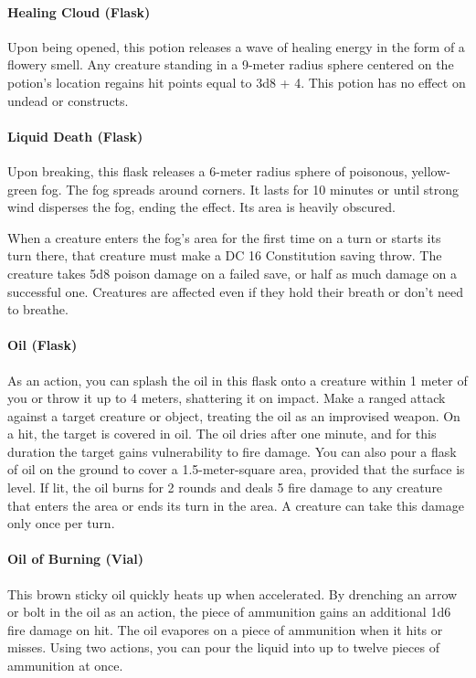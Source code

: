 \paragraph{Healing Cloud (Flask)} %
    Upon being opened, this potion releases a wave of healing energy in the form of a flowery smell.
    Any creature standing in a 9-meter radius sphere centered on the potion's location regains hit points equal to 3d8 + 4.
    This potion has no effect on undead or constructs.
\paragraph{Liquid Death (Flask)} %
    Upon breaking, this flask releases a 6-meter radius sphere of poisonous, yellow-green fog.
    The fog spreads around corners.
    It lasts for 10 minutes or until strong wind disperses the fog, ending the effect.
    Its area is heavily obscured.

    When a creature enters the fog's area for the first time on a turn or starts its turn there, that creature must make a DC 16 Constitution saving throw.
    The creature takes 5d8 poison damage on a failed save, or half as much damage on a successful one.
    Creatures are affected even if they hold their breath or don't need to breathe.

\paragraph{Oil (Flask)}
    As an action, you can splash the oil in this flask onto a creature within 1 meter of you or throw it up to 4 meters, shattering it on impact.
    Make a ranged attack against a target creature or object, treating the oil as an improvised weapon.
    On a hit, the target is covered in oil.
    The oil dries after one minute, and for this duration the target gains vulnerability to fire damage.
    You can also pour a flask of oil on the ground to cover a 1.5-meter-square area, provided that the surface is level.
    If lit, the oil burns for 2 rounds and deals 5 fire damage to any creature that enters the area or ends its turn in the area.
    A creature can take this damage only once per turn.
\paragraph{Oil of Burning (Vial)} %
    This brown sticky oil quickly heats up when accelerated.
    By drenching an arrow or bolt in the oil as an action, the piece of ammunition gains an additional 1d6 fire damage on hit.
    The oil evapores on a piece of ammunition when it hits or misses.
    Using two actions, you can pour the liquid into up to twelve pieces of ammunition at once.
